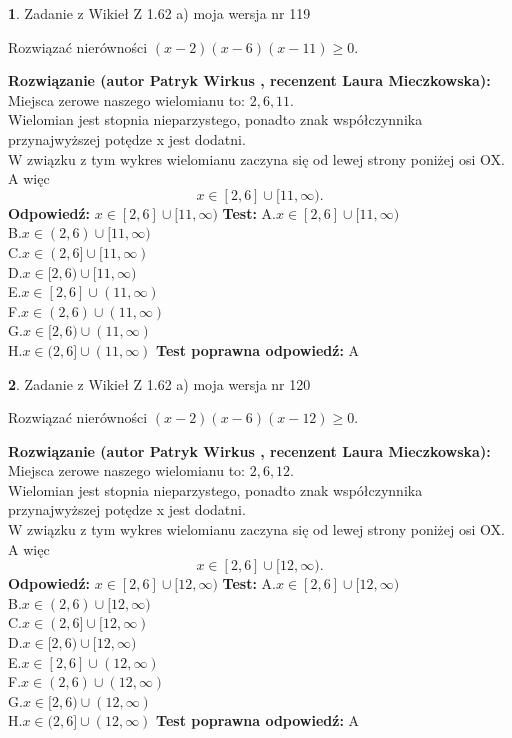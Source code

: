 \documentclass[12pt, a4paper]{article}
\theoremstyle{definition} %
\newtheorem{zad}{}
\newcommand{\zadStart}[1]{\begin{zad}#1\newline}
\newcommand{\zadStop}{\end{zad}}
\newcommand{\rozwStart}[2]{\noindent \textbf{Rozwiązanie (autor #1 , recenzent #2): }\newline}
\newcommand{\rozwStop}{\newline}
\newcommand{\odpStart}{\noindent \textbf{Odpowiedź:}\newline}
\newcommand{\odpStop}{\newline}
\newcommand{\testStart}{\noindent \textbf{Test:}\newline}
\newcommand{\testStop}{\newline}
\newcommand{\kluczStart}{\noindent \textbf{Test poprawna odpowiedź:}\newline}
\newcommand{\kluczStop}{\newline}
\begin{document}
\zadStart{Zadanie z Wikieł Z 1.62 a) moja wersja nr 119}

Rozwiązać nierówności $(x-2)(x-6)(x-11)\ge0$.
\zadStop
\rozwStart{Patryk Wirkus}{Laura Mieczkowska}
Miejsca zerowe naszego wielomianu to: $2, 6, 11$.\\
Wielomian jest stopnia nieparzystego, ponadto znak współczynnika przy\linebreak najwyższej potędze x jest dodatni.\\ W związku z tym wykres wielomianu zaczyna się od lewej strony poniżej osi OX. A więc $$x \in [2,6] \cup [11,\infty).$$
\rozwStop
\odpStart
$x \in [2,6] \cup [11,\infty)$
\odpStop
\testStart
A.$x \in [2,6] \cup [11,\infty)$\\
B.$x \in (2,6) \cup [11,\infty)$\\
C.$x \in (2,6] \cup [11,\infty)$\\
D.$x \in [2,6) \cup [11,\infty)$\\
E.$x \in [2,6] \cup (11,\infty)$\\
F.$x \in (2,6) \cup (11,\infty)$\\
G.$x \in [2,6) \cup (11,\infty)$\\
H.$x \in (2,6] \cup (11,\infty)$
\testStop
\kluczStart
A
\kluczStop



\zadStart{Zadanie z Wikieł Z 1.62 a) moja wersja nr 120}

Rozwiązać nierówności $(x-2)(x-6)(x-12)\ge0$.
\zadStop
\rozwStart{Patryk Wirkus}{Laura Mieczkowska}
Miejsca zerowe naszego wielomianu to: $2, 6, 12$.\\
Wielomian jest stopnia nieparzystego, ponadto znak współczynnika przy\linebreak najwyższej potędze x jest dodatni.\\ W związku z tym wykres wielomianu zaczyna się od lewej strony poniżej osi OX. A więc $$x \in [2,6] \cup [12,\infty).$$
\rozwStop
\odpStart
$x \in [2,6] \cup [12,\infty)$
\odpStop
\testStart
A.$x \in [2,6] \cup [12,\infty)$\\
B.$x \in (2,6) \cup [12,\infty)$\\
C.$x \in (2,6] \cup [12,\infty)$\\
D.$x \in [2,6) \cup [12,\infty)$\\
E.$x \in [2,6] \cup (12,\infty)$\\
F.$x \in (2,6) \cup (12,\infty)$\\
G.$x \in [2,6) \cup (12,\infty)$\\
H.$x \in (2,6] \cup (12,\infty)$
\testStop
\kluczStart
A
\kluczStop
\end{document}
